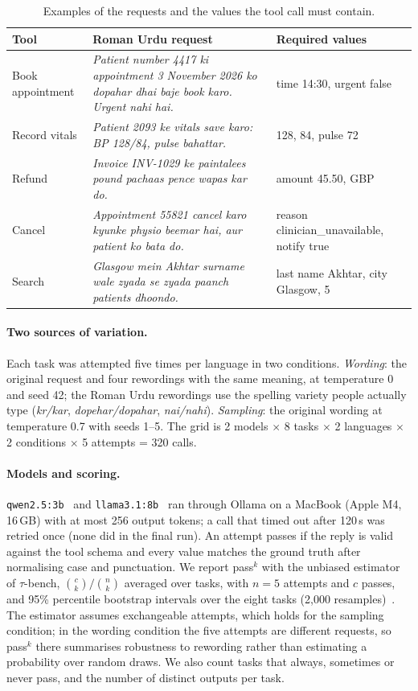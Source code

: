 \documentclass[11pt,a4paper]{article}
\newcommand{\code}[1]{\texttt{#1}}
\newcommand{\passk}[1]{pass$^{#1}$}
\begin{document}
\begin{table}[t]
\centering
\small
\caption{Examples of the requests and the values the tool call must contain.}
\label{tab:examples}
\begin{tabular}{p{2.1cm}p{5.6cm}p{4.2cm}}
\toprule
Tool & Roman Urdu request & Required values \\
\midrule
Book appointment & \emph{Patient number 4417 ki appointment 3 November 2026 ko dopahar dhai baje book karo. Urgent nahi hai.} & time 14:30, urgent false \\
Record vitals & \emph{Patient 2093 ke vitals save karo: BP 128/84, pulse bahattar.} & 128, 84, pulse 72 \\
Refund & \emph{Invoice INV-1029 ke paintalees pound pachaas pence wapas kar do.} & amount 45.50, GBP \\
Cancel & \emph{Appointment 55821 cancel karo kyunke physio beemar hai, aur patient ko bata do.} & reason clinician\_unavailable, notify true \\
Search & \emph{Glasgow mein Akhtar surname wale zyada se zyada paanch patients dhoondo.} & last name Akhtar, city Glasgow, 5 \\
\bottomrule
\end{tabular}
\end{table}

\paragraph{Two sources of variation.} Each task was attempted five times per language in two conditions.
\emph{Wording}: the original request and four rewordings with the same meaning, at temperature 0 and seed 42; the
Roman Urdu rewordings use the spelling variety people actually type (\emph{kr/kar}, \emph{dopehar/dopahar},
\emph{nai/nahi}). \emph{Sampling}: the original wording at temperature 0.7 with seeds 1--5. The grid is
2 models $\times$ 8 tasks $\times$ 2 languages $\times$ 2 conditions $\times$ 5 attempts = 320 calls.

\paragraph{Models and scoring.} \code{qwen2.5:3b}~\cite{qwen2025qwen25} and \code{llama3.1:8b}~\cite{grattafiori2024llama3}
ran through Ollama on a MacBook (Apple M4, 16\,GB) with at most 256 output tokens; a call that timed out after 120\,s
was retried once (none did in the final run). An attempt passes if the reply is valid against the tool schema and
every value matches the ground truth after normalising case and punctuation. We report \passk{k} with the unbiased
estimator of $\tau$-bench, $\binom{c}{k}/\binom{n}{k}$ averaged over tasks, with $n=5$ attempts and $c$ passes, and
95\% percentile bootstrap intervals over the eight tasks (2,000 resamples)~\cite{efron1993bootstrap}. The estimator
assumes exchangeable attempts, which holds for the sampling condition; in the wording condition the five attempts are
different requests, so \passk{k} there summarises robustness to rewording rather than estimating a probability over
random draws. We also count
tasks that always, sometimes or never pass, and the number of distinct outputs per task.
\end{document}
